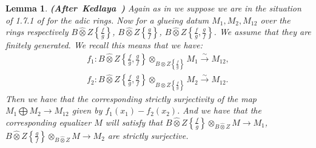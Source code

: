\documentclass[12pt]{amsart}
\newtheorem{lemma}[theorem]{Lemma}
\theoremstyle{definition}
\numberwithin{equation}{section}
\begin{document}
\begin{lemma}\mbox{\bf{(After Kedlaya \cite[Lemma 1.9.10]{Ked2})}} \label{lemma2.12}
Again as in \cite[Lemma 1.9.10]{Ked2} we suppose we are in the situation of 1.7.1 of \cite{Ked2} for the adic rings. Now for a glueing datum $M_1,M_2,M_{12}$ over the rings respectively $B\widehat{\otimes}Z\left\{\frac{f}{g}\right\}$, $B\widehat{\otimes}Z\left\{\frac{g}{f}\right\}$, $B\widehat{\otimes}Z\left\{\frac{f}{g},\frac{g}{f}\right\}$. We assume that they are finitely generated. We recall this means that we have:
\begin{align}
f_1: B\widehat{\otimes}Z\left\{\frac{f}{g},\frac{g}{f}\right\}\otimes_{B\widehat{\otimes}Z\left\{\frac{f}{g}\right\}}M_1\overset{\sim}{\rightarrow}M_{12},\\
f_2: B\widehat{\otimes}Z\left\{\frac{f}{g},\frac{g}{f}\right\}\otimes_{B\widehat{\otimes}Z\left\{\frac{f}{g}\right\}}M_2\overset{\sim}{\rightarrow}M_{12}.
\end{align}
Then we have that the corresponding strictly surjectivity of the map $M_1\bigoplus M_2\rightarrow M_{12}$ given by $f_1(x_1)-f_2(x_2)$. And we have that the corresponding equalizer $M$ will satisfy that $B\widehat{\otimes}Z\left\{\frac{f}{g}\right\} \otimes_{B\widehat{\otimes}Z}M\overset{}{\rightarrow}M_1$, $B\widehat{\otimes}Z\left\{\frac{g}{f}\right\}\otimes_{B\widehat{\otimes}Z}M\overset{}{\rightarrow}M_2$ are strictly surjective.	
\end{lemma}
\end{document}
